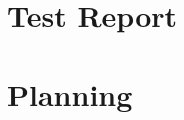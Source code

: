 \documentclass[12pt, letterpaper]{article}
\begin{document}
    \section{Test Report}




    \section{Planning}

\end{document}
